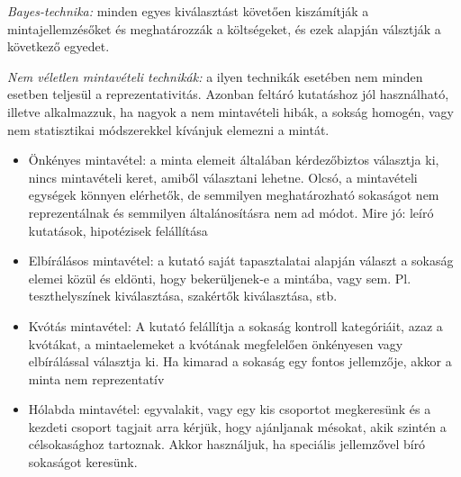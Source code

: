 \emph{Bayes-technika:} minden egyes kiválasztást követően kiszámítják a mintajellemzésőket és meghatározzák a költségeket, és ezek alapján válsztják a következő egyedet.

\emph{Nem véletlen mintavételi technikák:} a ilyen technikák esetében nem minden esetben teljesül a reprezentativitás. Azonban feltáró kutatáshoz jól használható, illetve alkalmazzuk, ha nagyok a nem mintavételi hibák, a sokság homogén, vagy nem statisztikai módszerekkel kívánjuk elemezni a mintát.
\begin{itemize}
\item Önkényes mintavétel: a minta elemeit általában kérdezőbiztos választja ki, nincs mintavételi keret, amiből választani lehetne. Olcsó, a mintavételi egységek könnyen elérhetők, de semmilyen meghatározható sokaságot nem reprezentálnak és semmilyen általánosításra nem ad módot. Mire jó: leíró kutatások, hipotézisek felállítása
\item Elbírálásos mintavétel: a kutató saját tapasztalatai alapján választ a sokaság elemei közül és eldönti, hogy bekerüljenek-e a mintába, vagy sem. Pl. teszthelyszínek kiválasztása, szakértők kiválasztása, stb.
\item Kvótás mintavétel: A kutató felállítja a sokaság kontroll kategóriáit, azaz a kvótákat, a mintaelemeket a kvótának megfelelően önkényesen vagy elbírálással választja ki. Ha kimarad a sokaság egy fontos jellemzője, akkor a minta nem reprezentatív
\item Hólabda mintavétel: egyvalakit, vagy egy kis csoportot megkeresünk és a kezdeti csoport tagjait arra kérjük, hogy ajánljanak mésokat, akik szintén a célsokasághoz tartoznak. Akkor használjuk, ha speciális jellemzővel bíró sokaságot keresünk.
\end{itemize}

